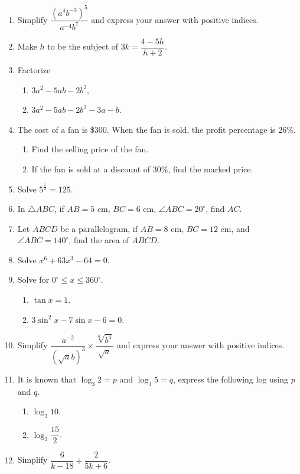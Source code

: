 \documentclass[12pt]{article}
\begin{document}
    \begin{enumerate}
        \item Simplify $\dfrac{(a^4b^{-3})^5}{a^{-4}b^7}$ and express your answer with positive indices.
        \item Make $h$ to be the subject of $3k=\dfrac{4-5h}{h+2}$.
        \item Factorize\begin{enumerate}
            \item $3a^2-5ab-2b^2$,
            \item $3a^2-5ab-2b^2-3a-b$.
        \end{enumerate}
        \item The cost of a fan is \$300. When the fan is sold, the profit percentage is 26\%.\begin{enumerate}
            \item Find the selling price of the fan.
            \item If the fan is sold at a discount of 30\%, find the marked price.
        \end{enumerate}
        \item Solve $5^\frac{x}{2}=125$.
        \item In $\triangle ABC$, if $AB=5$ cm, $BC=6$ cm, $\angle ABC=20^\circ$, find $AC$.
        \item Let $ABCD$ be a parallelogram, if $AB=8$ cm, $BC=12$ cm, and $\angle ABC=140^\circ$, find the area of $ABCD$.
        \item Solve $x^6+63x^3-64=0$.
        \item Solve for $0^\circ \leq  x \leq 360^\circ$.\begin{enumerate}
            \item $\tan{x}=1$.
            \item $3\sin^2{x}-7\sin{x}-6=0$.
        \end{enumerate}
        \item Simplify $\dfrac{a^{-2}}{(\sqrt{a}b)^3}\times\dfrac{\sqrt[3]{b^4}}{\sqrt{a}}$ and express your answer with positive indices.
        \item It is known that $\log_3{2}=p$ and $\log_3{5}=q$, express the following  log using $p$ and $q$.\begin{enumerate}
            \item $\log_3{10}$.
            \item $\log_3{\dfrac{15}{2}}$.
        \end{enumerate}
        \item Simplify $\dfrac{6}{k-18}+\dfrac{2}{5k+6}$.

\end{enumerate}
\end{document}
